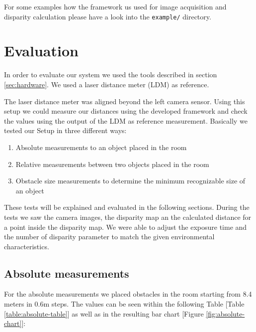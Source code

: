 \documentclass[11pt]{article}
\begin{document}
\bigskip
For some examples how the framework us used for image acquisition and disparity calculation please have a look into the \texttt{example/} directory. %


\section{Evaluation}
In order to evaluate our system we used the tools described in section \ref{sec:hardware}. We used a laser distance meter (LDM) as reference. 

The laser distance meter was aligned beyond the left camera sensor. Using this setup we could measure our distances using the developed framework and check the values using the output of the LDM as reference measurement. Basically we tested our Setup in three different ways:

\begin{enumerate}
  \item Absolute measurements to an object placed in the room
  \item Relative measurements between two objects placed in the room
  \item Obstacle size measurements to determine the minimum recognizable size of an object
\end{enumerate}

These tests will be explained and evaluated in the following sections. During the tests we saw the camera images, the disparity map an the calculated distance for a point inside the disparity map. We were able to adjust the exposure time and the number of disparity parameter to match the given environmental characteristics.

\subsection{Absolute measurements}
For the absolute measurements we placed obstacles in the room starting from 8.4 meters in 0.6m steps. The values can be seen within the following Table [Table \ref{table:absolute-table}] as well as in the resulting bar chart [Figure \ref{fig:absolute-chart}]:
\end{document}
